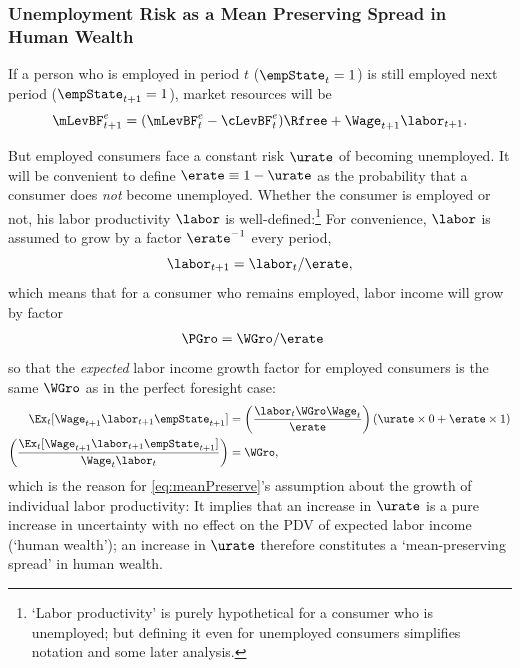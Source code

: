 \documentclass{handout}
\begin{document}
\subsubsection{Unemployment Risk as a Mean Preserving Spread in Human Wealth} \label{subsubsec:uMPS}
If a person who is employed in period $t$ ($\empState_{t}=1$) is still employed next
period ($\empState_{t+1}=1$), market resources will be
\begin{equation}
\mLevBF^{e}_{t+1} = (\mLevBF^{e}_{t}-\cLevBF^{e}_{t})\Rfree+\Wage_{t+1}\labor_{t+1}. \label{eq:Metp1}
\end{equation}

But employed consumers face a constant risk $\urate$ of becoming unemployed.  
It will be convenient to define $\erate\equiv 1-\urate$ as the probability that a consumer does {\it not} become unemployed.  Whether the consumer is employed or not, his labor productivity $\labor$ is well-defined:\footnote{`Labor productivity' is purely hypothetical for a consumer who is unemployed; but defining it even for unemployed consumers simplifies notation and some later analysis.}  For convenience, $\labor$ is assumed to grow by a factor $\erate^{-1}$ every period,
\begin{equation}
\labor_{t+1} =    \labor_{t}/\erate \label{eq:meanPreserve},
\end{equation}
which means that for a consumer who remains employed, labor income will grow by factor
\begin{equation}\begin{gathered}\begin{aligned}
  \PGro & =  \WGro/\erate
\end{aligned}\end{gathered}\end{equation}
so that the {\it expected} labor income growth factor for
employed consumers is the same $\WGro$ as in the perfect foresight case:
\begin{equation*}\begin{gathered}\begin{aligned}
  \Ex_{t}[\Wage_{t+1}\labor_{t+1}\empState_{t+1}] & =   \left(\frac{\labor_{t} \WGro \Wage_{t}}{\erate}\right)\left(\urate \times 0 + \erate \times 1 \right)
\\ \left(\frac{\Ex_{t}[\Wage_{t+1}\labor_{t+1}\empState_{t+1}]}{\Wage_{t} \labor_{t}}\right) &  =  \WGro
,
\end{aligned}\end{gathered}\end{equation*}
which is  the reason for \eqref{eq:meanPreserve}'s assumption about the growth of
individual labor productivity: It implies
that an increase in $\urate$ is a pure increase in uncertainty with no
effect on the PDV of expected labor income (`human wealth'); an increase in $\urate$ therefore constitutes a `mean-preserving spread' in human wealth.
\end{document}
